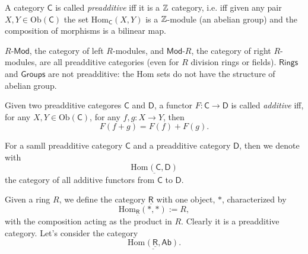 \begin{defn}
	A category $\mathsf{C}$ is called {\em preadditive} iff it is a $\mathbb{Z}$ category, i.e. iff
	given any pair $X,Y \in \mathrm{Ob} \left(\mathsf{C}\right)$ the set $\mathrm{Hom}_{\mathsf{C}} \left( X, Y \right)$ is a $\mathbb{Z}$-module (an abelian group) and the composition of morphisms is a bilinear map.
\end{defn}

\begin{ex}
	$R\text{-}\mathsf{Mod}$, the category of left $R$-modules, and $\mathsf{Mod}\text{-}R$, the category of right $R$-modules, are all preadditive categories (even for $R$ division rings or fields).\newline
	$\mathsf{Rings}$ and $\mathsf{Groups}$ are not preadditive: the Hom sets do not have the structure of abelian group.
\end{ex} 

\begin{defn}
	Given two preadditive categores $\mathsf{C}$ and $\mathsf{D}$, a functor $F: \mathsf{C} \to \mathsf{D}$ is called {\em additive} iff, for any $X,Y \in \mathrm{Ob} \left(\mathsf{C}\right)$, for any $f,g: X \to Y$, then
	\begin{equation}
		F(f+g) = F(f) + F(g)
	.\end{equation} 
\end{defn}

\begin{rem}
	For a samll preadditive category $\mathsf{C}$ and a preadditive category $\mathsf{D}$, then we denote with
	\begin{equation}
		\underline{\mathrm{Hom}_{} \left( \mathsf{C}, \mathsf{D} \right)}
	\end{equation} 
	the category of all additive functors from $\mathsf{C}$ to $\mathsf{D}$.
\end{rem}

\begin{ex}
	Given a ring $R$, we define the category $\underline{\mathsf{R}}$ with one object, $*$, characterized by
	\begin{equation}
		\mathrm{Hom}_{\underline{\mathsf{R}}} \left(* , * \right) := R
	,\end{equation} 
	with the composition acting as the product in $R$.
	Clearly it is a preadditive category.
	Let's consider the category
	\begin{equation}
		\underline{\mathrm{Hom}_{} \left( \underline{\mathsf{R}}, \mathsf{Ab} \right)}
	.\end{equation} 
\end{ex}

